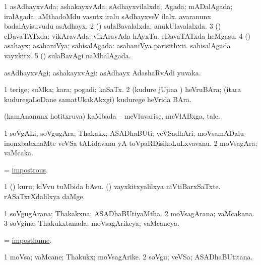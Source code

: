 \bentry
{}
\gl{\gu}
\bmng
\bnum
\num{1} asAdhayxvAda; ashakayxvAda; sAdhayxvilalxda; Agada; mADalAgada; iralAgada:  aMthadoMdu vasutx iralu sAdhayxveV ilalx.  avaranunx badalAyisuvudu asAdhayx. 
\num{2} (\saDi) sulaBavalalxda; anukUlavalalxda. 
\num{3} (\AmA) eDavaTATxda; vikAravAda:  vikAravAda hAyxTu.  eDavaTATxda heMgasu. 
\num{4} (\AmA) asahayx; asahaniVya; sahisalAgada:  asahaniVya parisithxti.  sahisalAgada vayxkitx. 
\num{5} (\saDi) sulaBavAgi naMbalAgada. 
\enum
\emng
\eentry

\bentry
{}
\gl{\kirxvi}
\bmng
asAdhayxvAgi; ashakayxvAgi:  asAdhayx AdashaRvAdi yuvaka. 
\emng
\eentry

\bentry
{}
\gl{\nA}
\bmng
\bnum
\num{1} terige; suMka; kara; pogadi; kaSaTx. 
\num{2} (kudure jUjina \ashi) heVruBAra; (itara kuduregaLoDane samatUkakAkxgi) kudurege heVrida BAra. 
\enum
\emng
\eentry

\bentry
{}
\gl{\nA}
\bmng
(kamAnanunx hotitxruva) kaMbada -- meVluvarise, meVlABxga, tale. 
\emng
\eentry

\bentry
{}
\gl{\nA}
\bmng
\bnum
\num{1} soVgALi; soVgugAra; Thakakx; ASADhaBUti; veVSadhAri; moVsamADalu inonxbabxnaMte veVSa tALidavanu yA toVpaRDisikoLuLxvavanu. 
\num{2} moVsagAra; vaMcaka. 
\enum
\emng
\eentry

\bentry
{}
\gl{\gu}
\bmng
 = \hyperlink{impostrous}{impostrous}. 
\emng
\eentry

\bentry
{}
\gl{\nA}
\bmng
\bnum
\num{1} (\pArxparx) kuru; kiVvu tuMbida bAvu. 
 (\rUpa) 
\banum
{} vayxkitxyalilxya niVtiBarxSaTxte. 
 rASaTxrXdalilxya daMge. 
\eanum
\numie
\enum
\emng
\eentry

\bentry
{}
\gl{\gu}
\bmng
\bnum
\num{1} soVgugArana; Thakakxna; ASADhaBUtiyaMtha. 
\num{2} moVsagArana; vaMcakana. 
\num{3} soVgina; Thakukxtanada; moVsagArikeya; vaMcaneya. 
\enum
\emng
\eentry

\bentry
{}
\gl{\nA}
\bmng
 = \hyperlink{imposthume}{imposthume}. 
\emng
\eentry

\bentry
{}
\gl{\nA}
\bmng
\bnum
\num{1} moVsa; vaMcane; Thakukx; moVsagArike. 
\num{2} soVgu; veVSa; ASADhaBUtitana. 
\enum
\emng
\eentry

